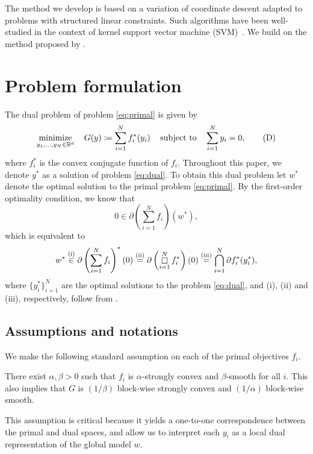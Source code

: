 The method we develop is based on a variation of coordinate descent adapted to problems with structured linear constraints. Such algorithms have been well-studied in the context of kernel support vector machine (SVM)~\citep{lut93,platt1998sequential,libsvm}. We build on the method proposed by \citet{necoara2017random}.

\section{Problem formulation}
\label{sec:problem}

The dual problem of problem \eqref{eq:primal} is given by 
\begin{equation} \label{eq:dual}
  \displaystyle\mathop{\hbox{\rm minimize}}_{y_1, \dots, y_N \in \mathbb{R}^d}\enspace\enspace G(y) \coloneqq \sum_{i=1}^N f_i^*(y_i) \enspace\enspace\mathop{\hbox{\rm subject to}}\enspace\enspace \sum_{i=1}^N y_i = 0, \tag{D}
\end{equation}
where $f_i^*$ is the convex conjugate function of $f_i$. Throughout this paper, we denote $y^*$ as a solution of problem \eqref{eq:dual}. To obtain this dual problem let $w^*$ denote the optimal solution to the primal problem \eqref{eq:primal}. By the first-order optimality condition, we know that 
\[0 \in \partial\left(\sum_{i = 1}^N f_i\right)(w^*),\]
which is equivalent to 
\[w^* \overset{\rm{(i)}}{\in} \partial\left(\sum_{i = 1}^N f_i\right)^*(0) \overset{\rm{(ii)}}{=} \partial\left(\mathop\square_{i=1}^N f_i^*\right)(0) \overset{\rm{(iii)}}{=} \bigcap_{i=1}^N \partial f_i^*(y_i^*),\]
where $\{y_i^*\}_{i=1}^N$ are the optimal solutions to the problem \eqref{eq:dual}, and (i), (ii) and (iii), respectively, follow from  \citet[Proposition~E.1.4.3, Proposition~E.2.3.2 and Corollary~D.4.5.5]{hiriart-urruty01}.

\subsection{Assumptions and notations}

We make the following standard assumption on each of the primal objectives $f_i$.
\begin{assumption} \label{assum:stronglyCvx_smooth}
  There exist $\alpha,\beta> 0$ such that $f_i$ is $\alpha$-strongly convex and $\beta$-smooth for all $i$. This also implies that $G$ is $(1/\beta)$ block-wise strongly convex and $(1/\alpha)$ block-wise smooth.
\end{assumption}
This assumption is critical because it yields a one-to-one correspondence between the primal and dual spaces, and allow us to interpret each $y_i$ as a local dual representation of the global model $w$. 

